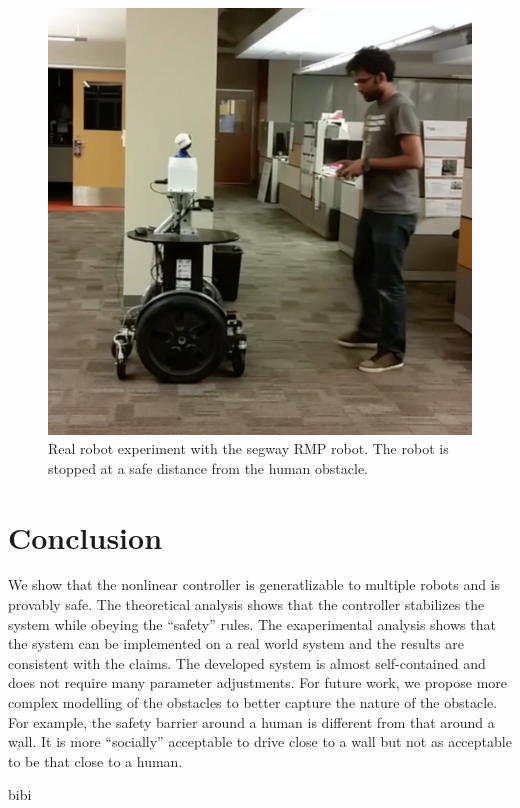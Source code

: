 \documentclass[conference]{IEEEtran}
\begin{document}
\begin{figure}[h!]
\centering
\includegraphics[scale=0.13]{jeeves_exp.png} 
\caption{Real robot experiment with the segway RMP robot. The robot is stopped at a safe distance from the human obstacle. \label{fig:jeeves_exp}}
\end{figure}


\section{Conclusion}
We show that the nonlinear controller is generatlizable to multiple robots and is provably safe. The theoretical analysis shows that the controller stabilizes the system while obeying the ``safety'' rules. The exaperimental analysis shows that the system can be implemented on a real world system and the results are consistent with the claims. The developed system is almost self-contained and does not require many parameter adjustments. 
For future work, we propose more complex modelling of the obstacles to better capture the nature of the obstacle. For example, the safety barrier around a human is different from that around a wall. It is more ``socially'' acceptable to drive close to a wall but not as acceptable to be that close to a human.


 {bibi}



\end{document}
